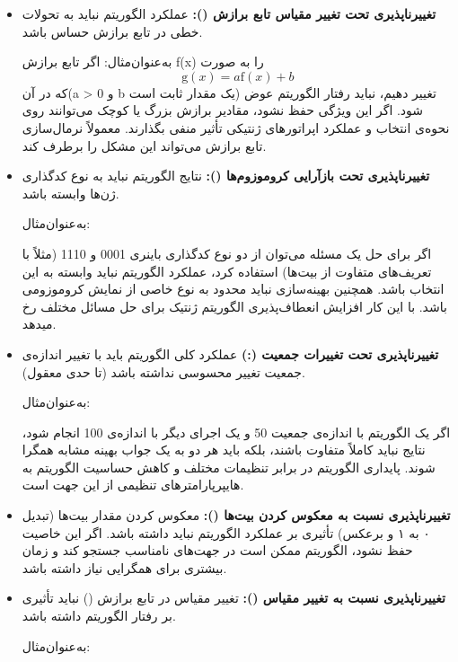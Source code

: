 \documentclass[12pt]{exam}
\begin{document}
\begin{questions}
\begin{itemize}
	 	\item \textbf{تغییرناپذیری تحت تغییر مقیاس تابع برازش ():}
	 	عملکرد الگوریتم نباید به تحولات خطی در تابع برازش حساس باشد.
	 	
	 	به‌عنوان‌مثال:
	 	اگر تابع برازش f(x) را به صورت
	 		\[\mathrm{g} (x) = a \mathrm{f} (x) + b \]
	 	که در آن(a > 0  و b  یک مقدار ثابت است) تغییر دهیم، نباید رفتار الگوریتم عوض شود. اگر این ویژگی حفظ نشود، مقادیر برازش بزرگ یا کوچک می‌توانند روی نحوه‌ی انتخاب و عملکرد اپراتورهای ژنتیکی تأثیر منفی بگذارند. معمولاً نرمال‌سازی تابع برازش می‌تواند این مشکل را برطرف کند.
	 	
	 	\item \textbf{تغییرناپذیری تحت بازآرایی کروموزوم‌ها ():}
	 	نتایج الگوریتم نباید به نوع کدگذاری ژن‌ها وابسته باشد.
	 	
	 	به‌عنوان‌مثال:
	 	
	 	اگر برای حل یک مسئله می‌توان از دو نوع کدگذاری باینری 0001  و 1110 (مثلاً با تعریف‌های متفاوت از بیت‌ها) استفاده کرد، عملکرد الگوریتم نباید وابسته به این انتخاب باشد. همچنین بهینه‌سازی نباید محدود به نوع خاصی از نمایش کروموزومی باشد. با این کار افزایش انعطاف‌پذیری الگوریتم ژنتیک برای حل مسائل مختلف رخ میدهد.
	 	
	 	\item \textbf{تغییرناپذیری تحت تغییرات جمعیت (:)}
	 	عملکرد کلی الگوریتم باید با تغییر اندازه‌ی جمعیت تغییر محسوسی نداشته باشد (تا حدی معقول).
	 	 
	 	به‌عنوان‌مثال:
	 	
	 	اگر یک الگوریتم با اندازه‌ی جمعیت 50 و یک اجرای دیگر با اندازه‌ی 100 انجام شود، نتایج نباید کاملاً متفاوت باشند، بلکه باید هر دو به یک جواب بهینه مشابه همگرا شوند. پایداری الگوریتم در برابر تنظیمات مختلف و کاهش حساسیت الگوریتم به هایپرپارامترهای تنظیمی از این جهت است. 
	 	
	 	\item \textbf{  تغییرناپذیری نسبت به معکوس کردن بیت‌ها ():}
	 	معکوس کردن مقدار بیت‌ها (تبدیل ۰ به ۱ و برعکس) تأثیری بر عملکرد الگوریتم نباید داشته باشد.
	 	اگر این خاصیت حفظ نشود، الگوریتم ممکن است در جهت‌های نامناسب جستجو کند و زمان بیشتری برای همگرایی نیاز داشته باشد.
	 	
	 	\item \textbf{ تغییرناپذیری نسبت به تغییر مقیاس ():}
	 	تغییر مقیاس در تابع برازش 
	 	() نباید تأثیری بر رفتار الگوریتم داشته باشد.
	 	
	 	به‌عنوان‌مثال: 
	 	

\end{itemize}
\end{questions}
\end{document}
